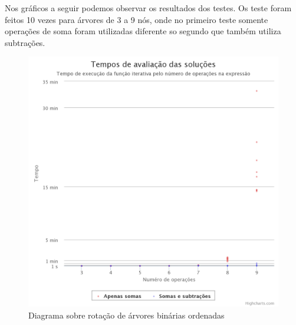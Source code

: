 	Nos gráficos a seguir podemos observar os resultados dos testes. Os teste foram feitos 10 vezes para árvores de 3 a 9 nós, onde no primeiro teste somente operações de soma foram utilizadas diferente so segundo que também utiliza subtrações.
	
\begin{figure}[H]
	\caption{\label{gram_cls}Diagrama sobre rotação de árvores binárias ordenadas}
	\begin{center}
	    \includegraphics[scale=0.25]{timming_test_lin.png}
	\end{center}
\end{figure}

